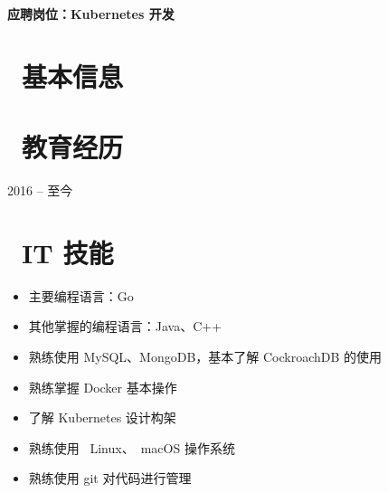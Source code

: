 \documentclass{resume}
\begin{document}

  \hfill \vspace{2mm} \par
\textbf{应聘岗位：Kubernetes 开发}

\section{\faInfo\ 基本信息} \vspace{1mm}

{\phone {} \qquad\qquad\quad
	\email {}
	\vspace{2mm} \par
	\github {} \qquad
	\faLink {}}

\section{\faGraduationCap\ 教育经历} \vspace{1mm}

{2016 -- 至今}

\section{\faCogs\ IT 技能} \vspace{1mm}

\begin{itemize}[parsep=1ex]
	\item 主要编程语言：Go
	\item 其他掌握的编程语言：Java、C++
	\item 熟练使⽤ MySQL、MongoDB，基本了解 CockroachDB 的使用
	\item 熟练掌握 Docker 基本操作
	\item 了解 Kubernetes 设计构架
	\item 熟练使⽤ \faLinux\ {Linux}、\faApple\ {macOS} 操作系统
	\item 熟练使用 git 对代码进行管理
\end{itemize}
\end{document}
